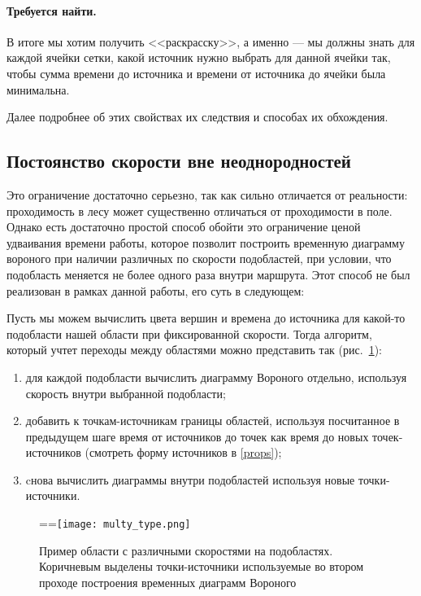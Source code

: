 \documentclass[12pt]{article}
\begin{document}
\paragraph{Требуется найти.}
В итоге мы хотим получить <<раскрасску>>, а именно --- мы должны знать для
каждой ячейки сетки, какой источник нужно выбрать для данной ячейки так, 
чтобы сумма времени до источника и времени от источника до ячейки была 
минимальна.

Далее подробнее об этих свойствах их следствия и способах их обхождения.

\subsection{Постоянство скорости вне неоднородностей}
\label{multi_type}
Это ограничение достаточно серьезно, так как сильно отличается от реальности:
проходимость в лесу может существенно отличаться от проходимости в поле. 
Однако есть достаточно простой способ обойти это ограничение ценой удваивания
времени работы, которое позволит построить временную диаграмму вороного при
наличии различных по скорости подобластей, при условии, что подобласть меняется
не более одного раза внутри маршрута. Этот способ не был реализован в рамках 
данной работы, его суть в следующем:

Пусть мы можем вычислить цвета вершин и времена до источника для какой-то 
подобласти нашей области при фиксированной скорости. Тогда алгоритм, который
учтет переходы между областями можно представить так (рис.~\ref{multi_type_fig}):
\begin{enumerate}
\item для каждой подобласти вычислить диаграмму Вороного отдельно, используя
скорость внутри выбранной подобласти;
\item добавить к точкам-источникам границы областей, используя посчитанное в
предыдущем шаге время от источников до точек как время до новых 
точек-источников (смотреть форму источников в \ref{props});
\item cнова вычислить диаграммы внутри подобластей используя новые
точки-источники.
\end{enumerate}
\begin{figure}
==\center\texttt{[image: multy\_type.png]}
\caption{Пример области с различными скоростями на подобластях. Коричневым
выделены точки-источники используемые во втором проходе построения временных
диаграмм Вороного}
\label{multi_type_fig}
\end{figure}
\end{document}
